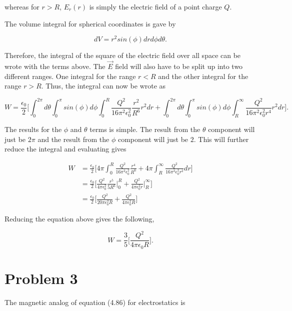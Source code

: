 \documentclass[11pt]{article}
\begin{document}
whereas for $r > R$, $E_{r}(r)$ is simply the electric field of a point charge $Q$.

The volume integral for spherical coordinates is gave by 

$$
dV = r^{2}sin(\phi) drd\phi d\theta.
$$

Therefore, the integral of the square of the electric field over all space can be wrote with the terms above. The $\vec{E}$ field will also have to be split up into two different ranges. One integral for the range $r < R$ and the other integral for the range $r > R$. Thus, the integral can now be wrote as

$$
W = \frac{\epsilon_{0}}{2} \Bigg[ \int_{0}^{2\pi} d\theta \int_{0}^{\pi} sin(\phi) d\phi \int_{0}^{R} \frac{Q^{2}}{16\pi^{2}\epsilon_{0}^{2}} \frac{r^{2}}{R^{6}} r^{2} dr + \int_{0}^{2\pi} d\theta \int_{0}^{\pi} sin(\phi) d\phi \int_{R}^{\infty} \frac{Q^{2}}{16\pi^{2}\epsilon_{0}^{2}r^{4}} r^{2} dr \Bigg].
$$

\newpage

The results for the $\phi$ and $\theta$ terms is simple. The result from the $\theta$ component will just be $2\pi$ and the result from the $\phi$ component will just be $2$. This will further reduce the integral and evaluating gives

\begin{align*}
W &= \frac{\epsilon_{0}}{2} \Bigg[ 4\pi \int_{0}^{R} \frac{Q^{2}}{16\pi^{2}\epsilon_{0}^{2}}  \frac{r^{4}}{R^{6}} + 4\pi \int_{R}^{\infty} \frac{Q^{2}}{16\pi^{2}\epsilon_{0}^{2}r^{2}} dr \Bigg] \\
&= \frac{\epsilon_{0}}{2} \Bigg[ \frac{Q^{2}}{4\pi \epsilon_{0}^{2}} \frac{r^{5}}{5 R^{6}} \Bigg|_{0}^{R}  + \frac{Q^{2}}{4\pi \epsilon_{0}^{2}r} \Bigg|_{R}^{\infty} \Bigg] \\
&= \frac{\epsilon_{0}}{2} \Bigg[ \frac{Q^{2}}{20\pi \epsilon_{0}^{2}R} + \frac{Q^{2}}{4\pi \epsilon_{0}^{2}R}  \Bigg]
\end{align*}

Reducing the equation above gives the following,

$$
W = \frac{3}{5} \Bigg[\frac{Q^{2}}{4\pi\epsilon_{0}R} \Bigg].
$$

\clearpage

\section*{Problem 3}

The magnetic analog of equation (4.86) for electrostatics is
\end{document}

